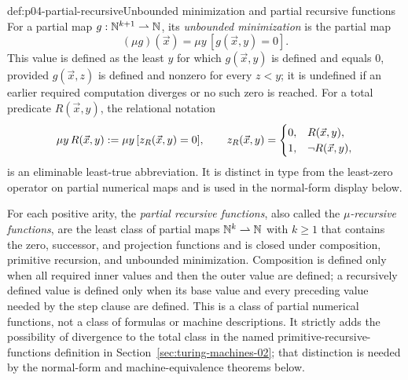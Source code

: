 \begin{hbdefinition}{def:p04-partial-recursive}{Unbounded minimization and partial recursive functions}
For a partial map \(g:\mathbb{N}^{k+1}\rightharpoonup\mathbb{N}\), its \emph{unbounded
minimization} is the partial map
\[
  (\mu g)(\vec x)=\mu y\,[g(\vec x,y)=0].
\]
This value is defined as the least \(y\) for which \(g(\vec x,y)\) is defined
and equals \(0\), provided \(g(\vec x,z)\) is defined and nonzero for every
\(z<y\); it is undefined if an earlier required computation diverges or no
such zero is reached.  For a total predicate \(R(\vec x,y)\), the relational
notation
\[
 \mu y\,R(\vec x,y)
 \mathrel{:=} \mu y\,[z_R(\vec x,y)=0],
 \qquad
 z_R(\vec x,y)=
 \begin{cases}0,&R(\vec x,y),\\1,&\neg R(\vec x,y),\end{cases}
\]
is an eliminable least-true abbreviation.  It is distinct in type from the
least-zero operator on partial numerical maps and is used in the normal-form
display below.

For each positive arity, the \emph{partial recursive functions}, also called the
\emph{\(\mu\)-recursive functions}, are the least class of
partial maps \(\mathbb{N}^k\rightharpoonup\mathbb{N}\) with \(k\geq1\) that contains the zero,
successor, and projection functions and is closed under composition, primitive
recursion, and unbounded minimization.  Composition is defined only when all
required inner values and then the outer value are defined; a recursively
defined value is defined only when its base value and every preceding value
needed by the step clause are defined.  This is a class of partial numerical
functions, not a class of formulas or machine descriptions.  It strictly adds
the possibility of divergence to the total class in
the named primitive-recursive-functions definition in
Section~\ref{sec:turing-machines-02}; that distinction is
needed by the normal-form and machine-equivalence theorems below.
\end{hbdefinition}

